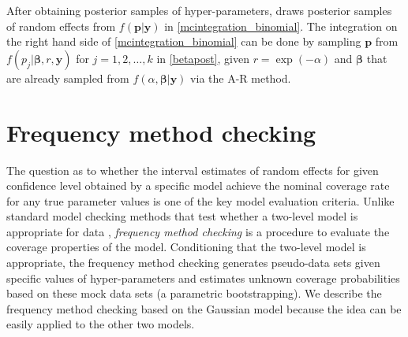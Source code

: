 \documentclass[article]{jss}
\begin{document}


After obtaining posterior samples of hyper-parameters,  draws posterior samples of random effects from $f(\boldsymbol{p}\vert \boldsymbol{y})$ in \eqref{mcintegration_binomial}. The integration on the right hand side of \eqref{mcintegration_binomial} can be done by sampling $\boldsymbol{p}$ from $f(p_j\vert \boldsymbol{\beta}, r, \boldsymbol{y})$  for $j=1, 2, \ldots, k$ in  \eqref{betapost},  given $r=\exp(-\alpha)$ and $\boldsymbol{\beta}$ that are already sampled from $f(\alpha, \boldsymbol{\beta}\vert \boldsymbol{y})$ via the A-R method. 




\section{Frequency method checking}\label{sec4}
The question as to whether the interval estimates of random effects for given confidence level obtained by a specific model achieve the nominal coverage rate  for any true parameter values is one of the key model evaluation criteria. Unlike standard model checking methods that test whether a two-level model is appropriate for data  \citep{dean1992testing, modelchecking1996}, \emph{frequency method checking} is a procedure to evaluate the coverage properties of the model.   Conditioning that the two-level model is appropriate, the frequency method checking generates pseudo-data sets given specific values of hyper-parameters  and estimates unknown coverage probabilities based on these mock data sets (a parametric bootstrapping). We  describe the frequency method checking based on the Gaussian model because the idea can be easily applied to the other two models.
\end{document}
